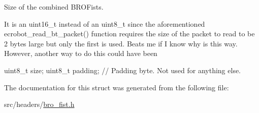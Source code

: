 Size of the combined BROFists. 

It is an uint16\_\-t instead of an uint8\_\-t since the aforementioned ecrobot\_\-read\_\-bt\_\-packet() function requires the size of the packet to read to be 2 bytes large but only the first is used. Beats me if I know why is this way. However, another way to do this could have been \begin{DoxyVerb}
uint8_t size;
uint8_t padding; // Padding byte. Not used for anything else. \end{DoxyVerb}
 

The documentation for this struct was generated from the following file:\begin{DoxyCompactItemize}
\item 
src/headers/\hyperlink{bro__fist_8h}{bro\_\-fist.h}\end{DoxyCompactItemize}

